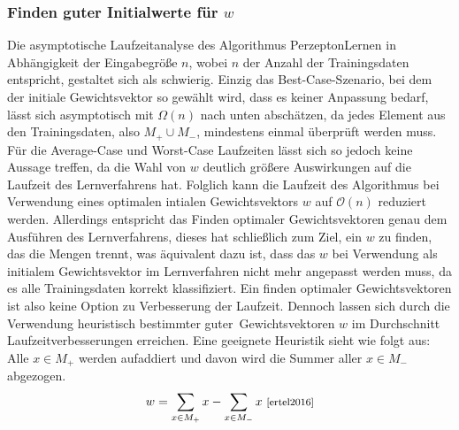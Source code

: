 \documentclass[fontsize=11pt]{scrartcl}
\begin{document}
                    \subsubsection{Finden guter Initialwerte für $w$}
                    Die asymptotische Laufzeitanalyse des Algorithmus PerzeptonLernen in Abhängigkeit der Eingabegröße $n$, wobei $n$ der Anzahl der Trainingsdaten entspricht, gestaltet sich als schwierig. Einzig das Best-Case-Szenario, bei dem der initiale Gewichtsvektor so gewählt wird, dass es keiner Anpassung bedarf, lässt sich asymptotisch mit $\Omega(n)$ nach unten abschätzen, da jedes Element aus den Trainingsdaten, also $M_+ \cup M_-$, mindestens einmal überprüft werden muss. Für die Average-Case und Worst-Case Laufzeiten lässt sich so jedoch keine Aussage treffen, da die Wahl von $w$ deutlich größere Auswirkungen auf die Laufzeit des Lernverfahrens hat.
                    Folglich kann die Laufzeit des Algorithmus bei Verwendung eines optimalen intialen Gewichtsvektors $w$ auf $\mathcal{O}(n)$ reduziert werden. Allerdings entspricht das Finden optimaler Gewichtsvektoren genau dem Ausführen des Lernverfahrens, dieses hat schließlich zum Ziel, ein $w$ zu finden, das die Mengen trennt, was äquivalent dazu ist, dass das $w$ bei Verwendung als initialem Gewichtsvektor im Lernverfahren nicht mehr angepasst werden muss, da es alle Trainingsdaten korrekt klassifiziert.
                    Ein finden optimaler Gewichtsvektoren ist also keine Option zu Verbesserung der Laufzeit.
                    \newline
                    Dennoch lassen sich durch die Verwendung heuristisch bestimmter \glqq guter\grqq\  Gewichtsvektoren $w$ im Durchschnitt Laufzeitverbesserungen erreichen.
                    Eine geeignete Heuristik sieht wie folgt aus: 
                    \newline
                    Alle $x\in M_+$ werden aufaddiert und davon wird die Summer aller $x\in M_-$ abgezogen.
                    $$
                        w = \sum_{x \in M_+}x - \sum_{x \in M_-}x \text{ \footnotesize\cite[S.206]{ertel2016}}
                    $$
\end{document}
